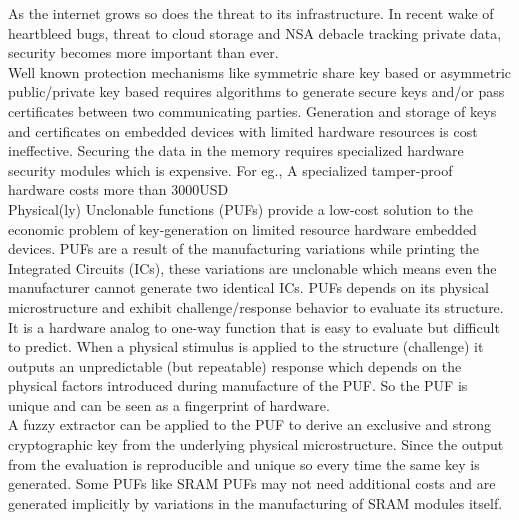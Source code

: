 As the internet grows so does the threat to its infrastructure.
In recent wake of heartbleed bugs, threat to cloud storage and NSA debacle tracking private data, security becomes more important than ever.\\

Well known protection mechanisms like symmetric share key based or asymmetric public/private key based requires algorithms to generate secure keys and/or pass certificates between two communicating parties. Generation and storage of keys and certificates on embedded devices with limited hardware resources is cost ineffective. Securing the data in the memory requires specialized hardware security modules which is expensive. For eg., A specialized tamper-proof hardware costs more than 3000USD
\cite{os8}\\

Physical(ly) Unclonable functions (PUFs) \cite{os9} provide a low-cost solution to the economic problem of key-generation on limited resource hardware embedded devices. PUFs are a result of the manufacturing variations while printing the Integrated Circuits (ICs), these variations are unclonable which means even the manufacturer cannot generate two identical ICs. PUFs depends on its physical microstructure and exhibit challenge/response behavior to evaluate its structure. It is a hardware analog to
one-way function that is easy to evaluate but difficult to predict. When a physical stimulus is applied to the structure (challenge) it outputs an unpredictable (but repeatable) response which depends on the physical factors introduced during manufacture of the PUF. So the PUF is unique and can be seen as a fingerprint of hardware.\cite{15}\\

A fuzzy extractor \cite{fuzzy} can be applied to the PUF to derive an exclusive and strong cryptographic key from the underlying physical microstructure. Since the output from the evaluation is reproducible and unique so every time the same key is generated. Some PUFs like SRAM PUFs may not need additional costs and are generated implicitly by variations in the manufacturing of SRAM modules itself.\\

